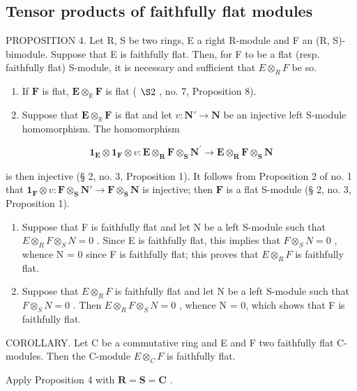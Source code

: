\subsection{Tensor products of faithfully flat modules}

PROPOSITION 4. Let R, S be two rings, E a right R-module and F an (R, S)-bimodule. Suppose that E is faithfully flat. Then, for F to be a flat (resp. faithfully flat) S-module, it is necessary and sufficient that \(E \otimes_{R} F\) be so.

\begin{enumerate}
\def\labelenumi{(\arabic{enumi})}
\item
  If \(\mathbf{F}\) is flat, \(\mathbf{E} \otimes_{\mathbb{R}} \mathbf{F}\) is flat ( \(\S 2\) , no. 7, Proposition 8).
\item
  Suppose that \(\mathbf{E} \otimes_{\mathbb{R}} \mathbf{F}\) is flat and let \(v: \mathbf{N}' \to \mathbf{N}\) be an injective left S-module homomorphism. The homomorphism
\end{enumerate}

\[
  \mathbf {1} _ {\mathbf {E}} \otimes \mathbf {1} _ {\mathbf {F}} \otimes v: \mathbf {E} \otimes_ {\mathbf {R}} \mathbf {F} \otimes_ {\mathbf {S}} \mathbf {N} ^ {\prime} \rightarrow \mathbf {E} \otimes_ {\mathbf {R}} \mathbf {F} \otimes_ {\mathbf {S}} \mathbf {N}
\]

is then injective (§ 2, no. 3, Proposition 1). It follows from Proposition 2 of no. 1 that \(\mathbf{1}_{\mathbf{F}} \otimes v \colon \mathbf{F} \otimes_{\mathbf{S}} \mathbf{N}' \to \mathbf{F} \otimes_{\mathbf{S}} \mathbf{N}\) is injective; then \(\mathbf{F}\) is a flat S-module (§ 2, no. 3, Proposition 1).

\begin{enumerate}
\def\labelenumi{(\arabic{enumi})}
\setcounter{enumi}{2}
\item
  Suppose that F is faithfully flat and let N be a left S-module such that \(E \otimes_{R} F \otimes_{S} N = 0\) . Since E is faithfully flat, this implies that \(F \otimes_{S} N = 0\) , whence N = 0 since F is faithfully flat; this proves that \(E \otimes_{R} F\) is faithfully flat.
\item
  Suppose that \(E \otimes_{R} F\) is faithfully flat and let N be a left S-module such that \(F \otimes_{S} N = 0\) . Then \(E \otimes_{R} F \otimes_{S} N = 0\) , whence N = 0, which shows that F is faithfully flat.
\end{enumerate}

COROLLARY. Let C be a commutative ring and E and F two faithfully flat C-modules. Then the C-module \(E \otimes_{C} F\) is faithfully flat.

Apply Proposition 4 with \(\mathbf{R} = \mathbf{S} = \mathbf{C}\) .

